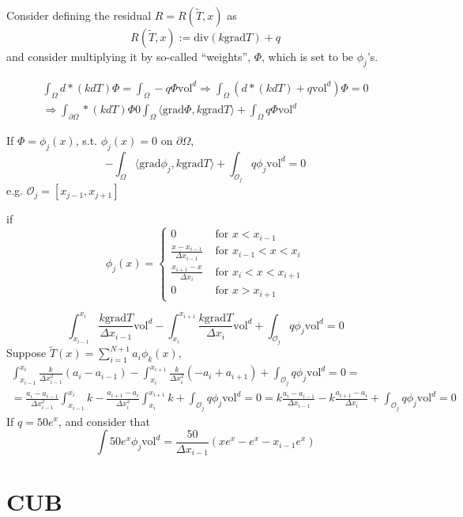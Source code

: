\documentclass[10pt]{amsart}
\begin{document}
\begin{multicols*}{2}
  Consider defining the residual $R= R(\widetilde{T},x)$ as
  \[
R(\widetilde{T},x):= \text{div}(k\text{grad}T) + q
\]
and consider multiplying it by so-called ``weights'', $\Phi$, which is set to be $\phi_j$'s.

\[
\begin{gathered}
  \int_{\Omega} d*(kdT) \Phi = \int_{\Omega}-q\Phi \text{vol}^d \Longrightarrow \int_{\Omega}(d*(kdT) + q\text{vol}^d) \Phi = 0 \\ 
  \Longrightarrow \int_{\partial \Omega} *(kdT) \Phi 0 \int_{\Omega} \langle \text{grad}\Phi, k \text{grad}T \rangle + \int_{\Omega} q\Phi \text{vol}^d
  \end{gathered}
\]

If $\Phi= \phi_j(x)$, s.t. $\phi_j(x) =0$ on $\partial \Omega$,
\[
-\int_{\Omega} \langle \text{grad}\phi_j, k \text{grad} T\rangle + \int_{\mathcal{O}_j } q\phi_j\text{vol}^d = 0 
\]
e.g. $\mathcal{O}_j = [ x_{j-1}, x_{j+1}]$

if
\[
\phi_j(x) = \begin{cases} 0 & \text{ for } x < x_{i-1} \\
  \frac{ x- x_{i-1} }{ \Delta x_{i-1} } & \text{ for } x_{i-1} < x < x_i \\
  \frac{ x_{i+1} - x}{ \Delta x_i } & \text{ for } x_i < x < x_{i+1} \\
  0 & \text{ for } x > x_{i+1} \end{cases}
\]

\[
\int_{x_{i-1}}^{x_i} \frac{k \text{grad} T}{\Delta x_{i-1}} \text{vol}^d - \int_{x_i}^{x_{i+1}} \frac{k\text{grad}T }{ \Delta x_i} \text{vol}^d + \int_{\mathcal{O}_j } q \phi_j\text{vol}^d = 0 
\]
Suppose $\widetilde{T}(x) = \sum_{i=1}^{N+1} a_i \phi_k(x)$,
\[
\begin{gathered}
  \int_{x_{i-1}}^{x_i} \frac{k}{ \Delta x_{i-1}^2 } (a_i - a_{i-1} ) - \int_{x_i}^{x_{i+1} }\frac{k}{ \Delta x_i^2} (-a_i + a_{i+1} ) + \int_{\mathcal{O}_j} q \phi_j \text{vol}^d = 0 = \\
  = \frac{a_i - a_{i-1}}{ \Delta x_{i-1}^2 } \int_{x_{i-1}}^{x_i} k  - \frac{a_{i+1} - a_i }{ \Delta x_i^2} \int_{x_i}^{x_{i+1} }k + \int_{\mathcal{O}_j} q\phi_j\text{vol}^d = 0 = k \frac{ a_i - a_{i-1}}{\Delta x_{i-1} } - k \frac{ a_{i+1} - a_i }{ \Delta x_i}  + \int_{\mathcal{O}_j} q\phi_j\text{vol}^d = 0
\end{gathered}
\]
If $q= 50 e^x$, and consider that
\[
\int  50 e^x \phi_j \text{vol}^d = \frac{50}{ \Delta x_{i-1} } (xe^x- e^x - x_{i-1} e^x)
\]

\part{CUB}


\end{multicols*}
\end{document}
